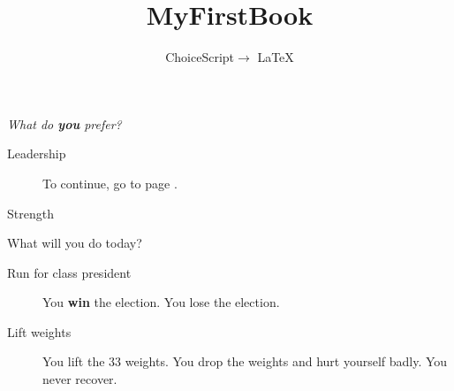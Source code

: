 \documentclass{book}
\begin{document}
\title{MyFirstBook}
\date{}
\author{ChoiceScript$\rightarrow$ LaTeX}
\maketitle
{\it
What
do
{\bf
you
}%
prefer?
}%
\begin{description}
\item[Leadership]
To continue, go to page \pageref{action}.
\item[Strength]
\end{description}
\newpage
{}\label{action}

What
will
you
do
today?
\begin{description}
\item[Run for class president]
You
{\bf
win
}%
the
election.
You
lose
the
election.
\item[Lift weights]
You
lift
the
33
weights.
You
drop
the
weights
and
hurt
yourself
badly.
You
never
recover.
\end{description}
\end{document}

